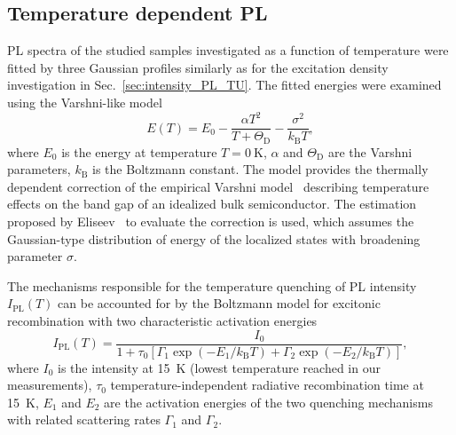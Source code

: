 \newpage
\subsection{Temperature dependent PL}
\label{Sec:temp_PL_TU}
PL spectra of the studied samples investigated as a function of temperature were fitted by three Gaussian profiles similarly as for the excitation density investigation in Sec.~\ref{sec:intensity_PL_TU}. The fitted energies were examined using the Varshni-like model
%
\begin{equation}
E(T)=E_0-\frac{\alpha T^2}{T+\Theta_\mathrm{D}}-\frac{\sigma^2}{k_\mathrm{B}T}, \label{eq:Varshni-like}
\end{equation}
where $E_0$ is the energy at temperature $T=0~\mathrm{K}$, $\alpha$ and $\Theta_\mathrm{D}$ are the Varshni parameters, $k_\mathrm{B}$ is the Boltzmann constant. The model provides the thermally dependent correction of the empirical Varshni model~\citep{Varshni} describing temperature effects on the band gap of an idealized bulk semiconductor. The estimation proposed by Eliseev~\citep{Eliseev_apl2003_PLtemp} to evaluate the correction is used, which assumes the Gaussian-type distribution of energy of the localized states with broadening parameter $\sigma$.

The mechanisms responsible for the temperature quenching of PL intensity $I_\mathrm{PL}(T)$ can be accounted for by the Boltzmann model for excitonic recombination with two characteristic activation energies~\citep{Daly_prb1995, Alen_apl2011}
\begin{equation}
I_\mathrm{PL}(T)=\frac{I_0}{1+\tau_0\left[\Gamma_1\exp(-E_1/k_\mathrm{B}T)+\Gamma_2\exp(-E_2/k_\mathrm{B}T)\right]},               \label{eq:Arhenius}
\end{equation}
where $I_0$ is the intensity at 15~K (lowest temperature reached in our measurements), $\tau_0$ temperature-independent radiative recombination time at 15~K, $E_1$ and $E_2$ are the activation energies of the two quenching mechanisms with related scattering rates $\Gamma_1$ and $\Gamma_2$.%
\newpage
